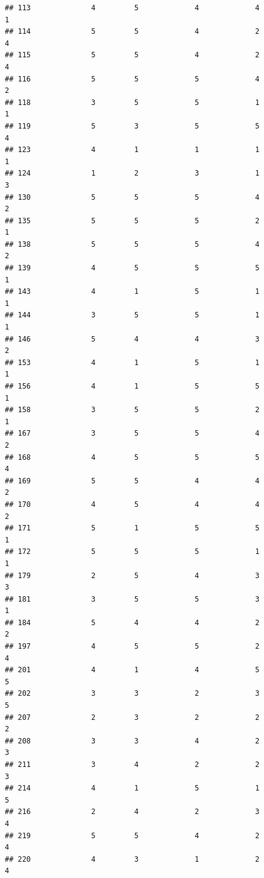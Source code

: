 \documentclass[
]{article}
\begin{document}
\begin{verbatim}
## 113              4         5             4             4           1
## 114              5         5             4             2           4
## 115              5         5             4             2           4
## 116              5         5             5             4           2
## 118              3         5             5             1           1
## 119              5         3             5             5           4
## 123              4         1             1             1           1
## 124              1         2             3             1           3
## 130              5         5             5             4           2
## 135              5         5             5             2           1
## 138              5         5             5             4           2
## 139              4         5             5             5           1
## 143              4         1             5             1           1
## 144              3         5             5             1           1
## 146              5         4             4             3           2
## 153              4         1             5             1           1
## 156              4         1             5             5           1
## 158              3         5             5             2           1
## 167              3         5             5             4           2
## 168              4         5             5             5           4
## 169              5         5             4             4           2
## 170              4         5             4             4           2
## 171              5         1             5             5           1
## 172              5         5             5             1           1
## 179              2         5             4             3           3
## 181              3         5             5             3           1
## 184              5         4             4             2           2
## 197              4         5             5             2           4
## 201              4         1             4             5           5
## 202              3         3             2             3           5
## 207              2         3             2             2           2
## 208              3         3             4             2           3
## 211              3         4             2             2           3
## 214              4         1             5             1           5
## 216              2         4             2             3           4
## 219              5         5             4             2           4
## 220              4         3             1             2           4

\end{verbatim}
\end{document}
